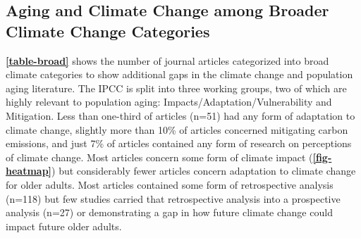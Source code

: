 \documentclass[12pt]{article}
\begin{document}
\begin{table}[]
\centering
{}
\caption{\textbf{Number of articles broadly categorized as aspects of Vulnerability.} Vulnerability is often defined as VESA, where Vulnerability is equal to exposure multiplied by sensitivity multiplied by adaptive capacity. Most published research on climate change and population aging focuses on sensitivity and exposure while very little published researches concerns adaptive capacity. A large number of articles (n=40) use an amphorous definition of `vulnerability.'}\label{table-vesa} 
\end{table}

\hypertarget{aging-and-climate-change-among-broader-climate-change-categories}{%
\subsection{Aging and Climate Change among Broader Climate Change
Categories}\label{aging-and-climate-change-among-broader-climate-change-categories}}

\textbf{\autoref{table-broad}} shows the number of journal articles
categorized into broad climate categories to show additional gaps in the
climate change and population aging literature. The IPCC is split into
three working groups, two of which are highly relevant to population
aging: Impacts/Adaptation/Vulnerability and Mitigation. Less than
one-third of articles (n=51) had any form of adaptation to climate
change, slightly more than 10\% of articles concerned mitigating carbon
emissions, and just 7\% of articles contained any form of research on
perceptions of climate change. Most articles concern some form of
climate impact (\textbf{\autoref{fig-heatmap}}) but considerably fewer
articles concern adaptation to climate change for older adults. Most
articles contained some form of retrospective analysis (n=118) but few
studies carried that retrospective analysis into a prospective analysis
(n=27) or demonstrating a gap in how future climate change could impact
future older adults.
\end{document}
